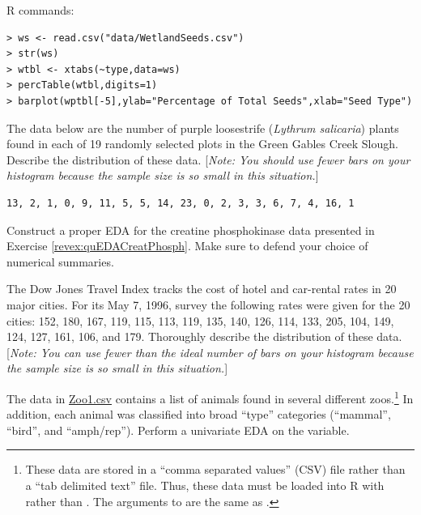 \documentclass[10pt,openany]{book}\usepackage[]{graphicx}\usepackage[]{color}
\makeatletter
\newenvironment{kframe}{%
 \def\at@end@of@kframe{}%
 \ifinner\ifhmode%
  \def\at@end@of@kframe{\end{minipage}}%
  \begin{minipage}{\columnwidth}%
 \fi\fi%
 \def\FrameCommand##1{\hskip\@totalleftmargin \hskip-\fboxsep
 \colorbox{shadecolor}{##1}\hskip-\fboxsep
     \hskip-\linewidth \hskip-\@totalleftmargin \hskip\columnwidth}%
 \MakeFramed {\advance\hsize-\width
   \@totalleftmargin\z@ \linewidth\hsize
   \@setminipage}}%
 {\par\unskip\endMakeFramed%
 \at@end@of@kframe}
\newenvironment{knitrout}{}{} %
\makeatother
\begin{document}
\begin{minipage}{\textwidth}
R commands:
\begin{knitrout}
\color{fgcolor}\begin{kframe}
\begin{verbatim}
> ws <- read.csv("data/WetlandSeeds.csv")
> str(ws)
> wtbl <- xtabs(~type,data=ws)
> percTable(wtbl,digits=1)
> barplot(wptbl[-5],ylab="Percentage of Total Seeds",xlab="Seed Type")
\end{verbatim}
\end{kframe}
\end{knitrout}
\end{minipage}

\begin{exsection}
  \item \label{revex:quEDAPL} \rhw{} The data below are the number of purple loosestrife (\textit{Lythrum salicaria}) plants found in each of 19 randomly selected plots in the Green Gables Creek Slough.  Describe the distribution of these data.  [\textit{Note: You should use fewer bars on your histogram because the sample size is so small in this situation.}] 
    \begin{Verbatim}[xleftmargin=5mm]
13, 2, 1, 0, 9, 11, 5, 5, 14, 23, 0, 2, 3, 3, 6, 7, 4, 16, 1
    \end{Verbatim}
  \item \label{revex:quEDACP} \rhw{} Construct a proper EDA for the creatine phosphokinase data presented in Exercise \ref{revex:quEDACreatPhosph}.  Make sure to defend your choice of numerical summaries.  
  \item \label{revex:quEDADJTI} \rhw{} \hspace{12pt} The Dow Jones Travel Index tracks the cost of hotel and car-rental rates in 20 major cities.  For its May 7, 1996, survey the following rates were given for the 20 cities: 152, 180, 167, 119, 115, 113, 119, 135, 140, 126, 114, 133, 205, 104, 149, 124, 127, 161, 106, and 179.  Thoroughly describe the distribution of these data.  [\textit{Note: You can use fewer than the ideal number of bars on your histogram because the sample size is so small in this situation.}] 
  \item \label{revex:cuEDAZoo1} \rhw{} The data in \href{}{Zoo1.csv} contains a list of animals found in several different zoos.\footnote{These data are stored in a ``comma separated values'' (CSV) file rather than a ``tab delimited text'' file.  Thus, these data must be loaded into R with  rather than .  The arguments to  are the same as .}  In addition, each animal was classified into broad ``type'' categories (``mammal'', ``bird'', and ``amph/rep'').  Perform a univariate EDA on the  variable. 

\end{exsection}
\end{document}
